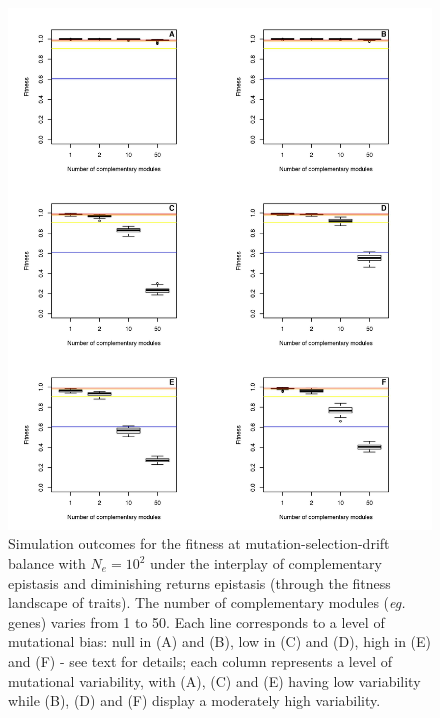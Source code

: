 \begin{figure}[h!]
    \centering
    \includegraphics[scale=0.83,trim=0cm 0.4cm 0cm 0.75cm,clip]{pics/Epistasis/Evo_Outcomes_Ne100.jpeg}
    \caption{Simulation outcomes for the fitness at mutation-selection-drift balance with $N_e=10^2$ under the interplay of complementary epistasis and diminishing returns epistasis (through the fitness landscape of traits). The number of complementary modules (\textit{eg.} genes) varies from 1 to 50. Each line corresponds to a level of mutational bias: null in (A) and (B), low in (C) and (D), high in (E) and (F) - see text for details; each column represents a level of mutational variability, with (A), (C) and (E) having low variability while (B), (D) and (F) display a moderately high variability.}
    \label{fig:Outcomes100}
\end{figure}

